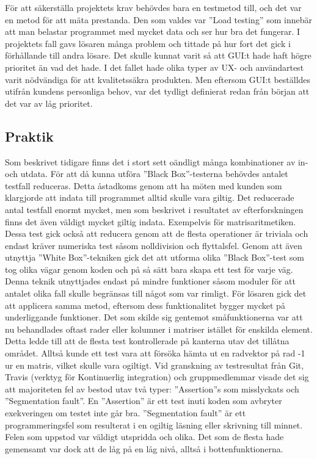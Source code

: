 För att säkerställa projektets krav behövdes bara en testmetod till, och det var en metod för att mäta prestanda. Den som valdes var ''Load testing'' som innebär att man belastar programmet med mycket data och ser hur bra det fungerar. I projektets fall gavs lösaren många problem och tittade på hur fort det gick i förhållande till andra lösare. \newline	
Det skulle kunnat varit så att GUI:t hade haft högre prioritet än vad det hade. I det fallet hade olika typer av UX- och användartest varit nödvändiga för att kvalitetssäkra produkten. Men eftersom GUI:t beställdes utifrån kundens personliga behov, var det tydligt definierat redan från början att det var av låg prioritet. 
	
	\subsection{Praktik}
	Som beskrivet tidigare finns det i stort sett oändligt många kombinationer av in- och utdata.	För att då kunna utföra ''Black Box''-testerna behövdes antalet testfall reduceras. Detta åstadkoms genom att ha möten med kunden som klargjorde att indata till programmet alltid skulle vara giltig. Det reducerade antal testfall enormt mycket, men som beskrivet i resultatet av efterforskningen finns det även väldigt mycket giltig indata. Exempelvis för matrisaritmetiken. Dessa test gick också att reducera genom att de flesta operationer är triviala och endast kräver numeriska test såsom nolldivision och flyttalsfel. Genom att även utnyttja ''White Box''-tekniken gick det att utforma olika ''Black Box''-test som tog olika vägar genom koden och på så sätt bara skapa ett test för varje väg. Denna teknik utnyttjades endast på mindre funktioner såsom moduler för att antalet olika fall skulle begränsas till något som var rimligt. \newline
	För lösaren gick det att applicera samma metod, eftersom dess funktionalitet bygger mycket på underliggande funktioner. Det som skilde sig gentemot småfunktionerna var att nu behandlades oftast rader eller kolumner i matriser istället för enskilda element. Detta ledde till att de flesta test kontrollerade på kanterna utav det tillåtna området. Alltså kunde ett test vara att försöka hämta ut en radvektor på rad -1 ur en matris, vilket skulle vara ogiltigt.\newline
Vid granskning av testresultat från Git, Travis (verktyg för Kontinuerlig integration) och gruppmedlemmar visade det sig att majoriteten fel av bestod utav två typer: ''Assertion''s som misslyckats och ''Segmentation fault''. En ''Assertion'' är ett test inuti koden som avbryter exekveringen om testet inte går bra. ''Segmentation fault'' är ett programmeringsfel som resulterat i en ogiltig läsning eller skrivning till minnet. Felen som uppstod var väldigt utspridda och olika. Det som de flesta hade gemensamt var dock att de låg på en låg nivå, alltså i bottenfunktionerna. \newline	
